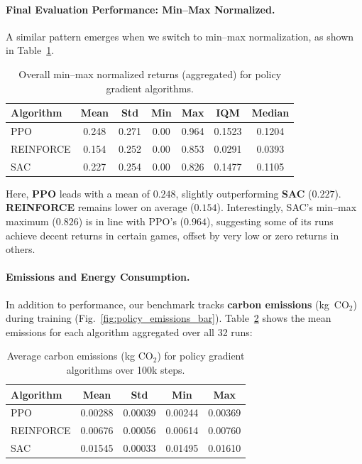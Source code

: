 \paragraph{Final Evaluation Performance: Min–Max Normalized.}
A similar pattern emerges when we switch to min–max normalization, as shown in Table~\ref{tab:policy_final_eval_minmax}.

\begin{table}[htbp]
	\centering
	\caption{Overall min--max normalized returns (aggregated) for policy gradient algorithms.}
	\label{tab:policy_final_eval_minmax}
	\begin{tabular}{lcccccc}
		\toprule
		\textbf{Algorithm} & \textbf{Mean} & \textbf{Std} & \textbf{Min} & \textbf{Max} & \textbf{IQM} & \textbf{Median} \\
		\midrule
		PPO         & 0.248 & 0.271 & 0.00 & 0.964 & 0.1523 & 0.1204 \\
		REINFORCE   & 0.154 & 0.252 & 0.00 & 0.853 & 0.0291 & 0.0393 \\
		SAC         & 0.227 & 0.254 & 0.00 & 0.826 & 0.1477 & 0.1105 \\
		\bottomrule
	\end{tabular}
\end{table}

\noindent
Here, \textbf{PPO} leads with a mean of $0.248$, slightly outperforming \textbf{SAC} ($0.227$). \textbf{REINFORCE} remains lower on average ($0.154$). Interestingly, SAC’s min–max maximum ($0.826$) is in line with PPO’s ($0.964$), suggesting some of its runs achieve decent returns in certain games, offset by very low or zero returns in others.

\paragraph{Emissions and Energy Consumption.}
In addition to performance, our benchmark tracks \textbf{carbon emissions} (kg~CO$_2$) during training (Fig.~\ref{fig:policy_emissions_bar}). Table~\ref{tab:policy_emissions} shows the mean emissions for each algorithm aggregated over all 32 runs:

\begin{table}[htbp]
	\centering
	\caption{Average carbon emissions (kg CO$_2$) for policy gradient algorithms over 100k steps.}
	\label{tab:policy_emissions}
	\begin{tabular}{lcccc}
		\toprule
		\textbf{Algorithm} & \textbf{Mean} & \textbf{Std} & \textbf{Min} & \textbf{Max} \\
		\midrule
		PPO         & 0.00288 & 0.00039 & 0.00244 & 0.00369 \\
		REINFORCE   & 0.00676 & 0.00056 & 0.00614 & 0.00760 \\
		SAC         & 0.01545 & 0.00033 & 0.01495 & 0.01610 \\
		\bottomrule
	\end{tabular}
\end{table}

